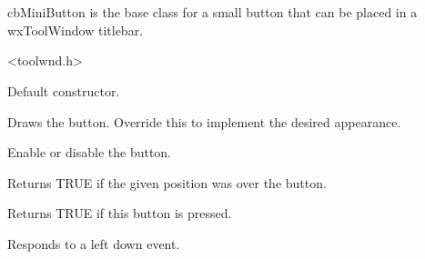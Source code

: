 %
%


\section{}\label{cbminibutton}


cbMiniButton is the base class for a small button that can be placed in a wxToolWindow
titlebar.




<toolwnd.h>




\label{cbminibuttoncbminibutton}


Default constructor.


\label{cbminibuttondraw}


Draws the button. Override this to implement
the desired appearance.


\label{cbminibuttonenable}


Enable or disable the button.


\label{cbminibuttonhittest}


Returns TRUE if the given position was over the button.


\label{cbminibuttonispressed}


Returns TRUE if this button is pressed.


\label{cbminibuttononleftdown}


Responds to a left down event.


\label{cbminibuttononleftup}

